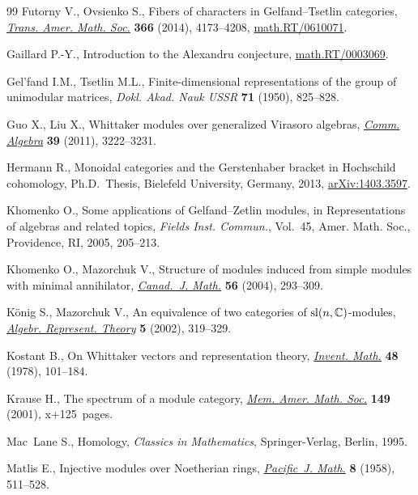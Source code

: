 \documentclass[pdftex]{sigma}
\begin{document}
\begin{thebibliography}{99}
Futorny V., Ovsienko S., Fibers of characters in {G}elfand--{T}setlin
  categories, \href{http://dx.doi.org/10.1090/S0002-9947-2014-05938-2}{\textit{Trans. Amer. Math. Soc.}} \textbf{366} (2014), 4173--4208,
  \href{http://arxiv.org/abs/math.RT/0610071}{math.RT/0610071}.

Gaillard P.-Y., Introduction to the Alexandru conjecture, \href{http://arxiv.org/abs/math.RT/0003069}{math.RT/0003069}.

Gel'fand I.M., Tsetlin M.L., Finite-dimensional representations of the group of
  unimodular matrices, \textit{Dokl. Akad. Nauk USSR} \textbf{71} (1950),
  825--828.

Guo X., Liu X., Whittaker modules over generalized {V}irasoro algebras,
  \href{http://dx.doi.org/10.1080/00927872.2010.499119}{\textit{Comm. Algebra}} \textbf{39} (2011), 3222--3231.

Hermann R., Monoidal categories and the Gerstenhaber bracket in Hochschild
  cohomology, Ph.D.~Thesis, Bielefeld University, Germany, 2013,
  \href{http://arxiv.org/abs/1403.3597}{arXiv:1403.3597}.

Khomenko O., Some applications of {G}elfand--{Z}etlin modules, in
  Representations of algebras and related topics, \textit{Fields Inst.
  Commun.}, Vol.~45, Amer. Math. Soc., Providence, RI, 2005, 205--213.

Khomenko O., Mazorchuk V., Structure of modules induced from simple modules
  with minimal annihilator, \href{http://dx.doi.org/10.4153/CJM-2004-014-5}{\textit{Canad.~J. Math.}} \textbf{56} (2004),
  293--309.

K{\"o}nig S., Mazorchuk V., An equivalence of two categories of {${\rm
  sl}(n,{\mathbb C})$}-modules, \href{http://dx.doi.org/10.1023/A:1016531419024}{\textit{Algebr. Represent. Theory}} \textbf{5}
  (2002), 319--329.

Kostant B., On {W}hittaker vectors and representation theory, \href{http://dx.doi.org/10.1007/BF01390249}{\textit{Invent.
  Math.}} \textbf{48} (1978), 101--184.

Krause H., The spectrum of a module category, \href{http://dx.doi.org/10.1090/memo/0707}{\textit{Mem. Amer. Math. Soc.}}
  \textbf{149} (2001), x+125~pages.

Mac~Lane S., Homology, \textit{Classics in Mathematics}, Springer-Verlag, Berlin, 1995.

Matlis E., Injective modules over {N}oetherian rings, \href{http://dx.doi.org/10.2140/pjm.1958.8.511}{\textit{Pacific~J. Math.}}
  \textbf{8} (1958), 511--528.


\end{thebibliography}
\end{document}
